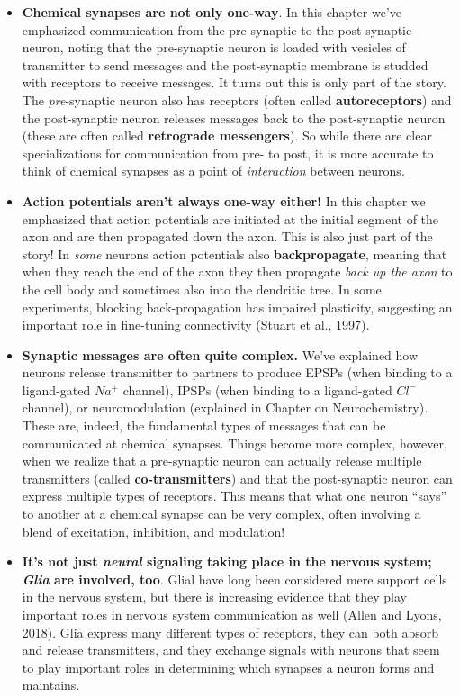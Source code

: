 \documentclass[
]{book}
\providecommand{\tightlist}{%
  \setlength{\itemsep}{0pt}\setlength{\parskip}{0pt}}
\begin{document}
\begin{itemize}
\tightlist
\item
  \textbf{Chemical synapses are not only one-way}. In this chapter we've emphasized communication from the pre-synaptic to the post-synaptic neuron, noting that the pre-synaptic neuron is loaded with vesicles of transmitter to send messages and the post-synaptic membrane is studded with receptors to receive messages. It turns out this is only part of the story. The \emph{pre}-synaptic neuron also has receptors (often called \textbf{autoreceptors}) and the post-synaptic neuron releases messages back to the post-synaptic neuron (these are often called \textbf{retrograde messengers}). So while there are clear specializations for communication from pre- to post, it is more accurate to think of chemical synapses as a point of \emph{interaction} between neurons.
\item
  \textbf{Action potentials aren't always one-way either!} In this chapter we emphasized that action potentials are initiated at the initial segment of the axon and are then propagated down the axon. This is also just part of the story! In \emph{some} neurons action potentials also \textbf{backpropagate}, meaning that when they reach the end of the axon they then propagate \emph{back up the axon} to the cell body and sometimes also into the dendritic tree. In some experiments, blocking back-propagation has impaired plasticity, suggesting an important role in fine-tuning connectivity (Stuart et al., 1997).
\item
  \textbf{Synaptic messages are often quite complex. }We've explained how neurons release transmitter to partners to produce EPSPs (when binding to a ligand-gated \(Na^+\) channel), IPSPs (when binding to a ligand-gated \(Cl^{-}\) channel), or neuromodulation (explained in Chapter on Neurochemistry). These are, indeed, the fundamental types of messages that can be communicated at chemical synapses. Things become more complex, however, when we realize that a pre-synaptic neuron can actually release multiple transmitters (called \textbf{co-transmitters}) and that the post-synaptic neuron can express multiple types of receptors. This means that what one neuron ``says'' to another at a chemical synapse can be very complex, often involving a blend of excitation, inhibition, and modulation!
\item
  \textbf{It's not just \emph{neural} signaling taking place in the nervous system; \emph{Glia} are involved, too}. Glial have long been considered mere support cells in the nervous system, but there is increasing evidence that they play important roles in nervous system communication as well (Allen and Lyons, 2018). Glia express many different types of receptors, they can both absorb and release transmitters, and they exchange signals with neurons that seem to play important roles in determining which synapses a neuron forms and maintains.\\

\end{itemize}
\end{document}
